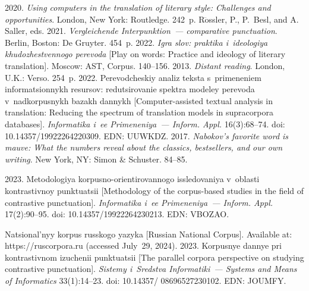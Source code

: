 \begin{multicols}{2}
{{\begin{thebibliography}{99}
 2020. \textit{Using computers in the translation of literary 
style: Challenges and opportunities}. London, New York: Routledge. 
242~p.
R$\ddot{\mbox{o}}$ssler, P., P.~Besl, and A. Saller, eds. 2021. 
\textit{Vergleichende Interpunktion~--- comparative punctuation}. Berlin, 
 Boston: De Gruyter. 454~p.
 2022. \textit{Igra slov: praktika i~ideologiya 
khu\-do\-zhest\-ven\-no\-go perevoda} [Play on words: Practice and ideology of literary 
translation]. Moscow: AST, Corpus. 140--156.
 2013. \textit{Distant reading}. London, U.K.: Verso. 254~p.
 2022. Perevodcheskiy analiz teks\-ta s~primeneniem 
informatsionnykh resursov: redutsirovanie spekt\-ra modeley perevoda 
v~nad\-kor\-pus\-nykh ba\-zakh dan\-nykh [Computer-assisted textual analysis 
in translation: Reducing the spectrum of translation models in supracorpora 
databases]. \textit{Informatika i~ee Primeneniya~--- Inform. Appl.} 16(3):68--74. 
doi: 10.14357/19922264220309. EDN: UUWKDZ.
 2017. \textit{Nabokov's favorite word is mauve: What the numbers 
reveal about the classics, bestsellers, and our own writing}. New York, NY: 
Simon \& Schuster. 84--85.

 2023. Metodologiya  
korpusno-orientirovannogo issledovaniya v~ob\-lasti kontrastivnoy punktuatsii 
[Methodology of the corpus-based studies in the field of contrastive punctuation]. 
\textit{Informatika i~ee Primeneniya~--- Inform. Appl.} 17(2):90--95. doi: 
10.14357/19922264230213. EDN: VBOZAO.

Natsional'nyy korpus russkogo yazyka [Russian National Corpus]. Available at: 
{\sf https://ruscorpora.ru} (accessed July~29, 2024).
 2023. Korpusnye dannye pri 
kontrastivnom izuchenii punk\-tu\-a\-tsii [The parallel corpora perspective on studying 
contrastive punctuation]. \textit{Sistemy i~Sredstva Informatiki~--- Systems and 
Means of Informatics} 33(1):14--23. doi: 10.14357/ 08696527230102. EDN: 
JOUMFY.


\end{thebibliography}}}
\end{multicols}
